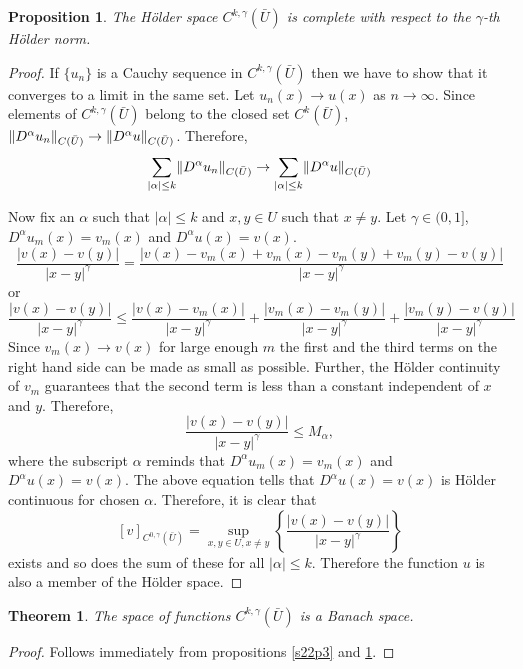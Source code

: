 \documentclass{article}
\DeclarePairedDelimiter\norm{\lVert}{\rVert}
\theoremstyle{plain}
\newtheorem{thm}{Theorem}
\numberwithin{thm}{section}
\theoremstyle{plain}
\newtheorem{prop}{Proposition}
\numberwithin{prop}{section}
\theoremstyle{definition}
\numberwithin{defn}{section}
\theoremstyle{remark}
\numberwithin{equation}{section}
\begin{document}
\begin{prop}\label{s22p4}
The H\"{o}lder space $C^{k, \gamma}(\bar{U})$ is complete with respect to the $\gamma$-th H\"{o}lder norm.
\end{prop}
\begin{proof}
If $\{u_n\}$ is a Cauchy sequence in $C^{k, \gamma}(\bar{U})$ then we have to show that it converges to a 
limit in the same set. Let $u_n(x) \rightarrow u(x)$ as $n \rightarrow \infty$. Since elements of
$C^{k, \gamma}(\bar{U})$ belong to the closed set $C^k(\bar{U})$, 
$\norm{D^\alpha u_n}_{C(\bar{U})} \rightarrow \norm{D^\alpha u}_{C(\bar{U})}$. Therefore,
\begin{equation}
\sum_{|\alpha| \le k}\norm{D^\alpha u_n}_{C(\bar{U})} \rightarrow 
\sum_{|\alpha| \le k}\norm{D^\alpha u}_{C(\bar{U})}
\end{equation}

Now fix an $\alpha$ such that $|\alpha| \le k$ and $x, y \in U$ such that $x \ne y$. Let $\gamma \in (0, 1]$,
 $D^\alpha u_m(x) = v_m(x)$ and $D^\alpha u(x) = v(x)$.
\[
\frac{|v(x) - v(y)|}{|x - y|^\gamma} = 
\frac{|v(x)- v_m(x) + v_m(x) - v_m(y) + v_m(y) - v(y)|}{|x - y|^\gamma}
\]
or
\[
\frac{|v(x) - v(y)|}{|x - y|^\gamma} \le
\frac{|v(x)- v_m(x)|}{|x - y|^\gamma} + \frac{|v_m(x)- v_m(y)|}{|x - y|^\gamma} + 
\frac{|v_m(y)- v(y)|}{|x - y|^\gamma}
\]
Since $v_m(x) \rightarrow v(x)$ for large enough $m$ the first and the third terms on the right hand side can be
made as small as possible. Further, the H\"{o}lder continuity of $v_m$ guarantees that the second term is less
than a constant independent of $x$ and $y$. Therefore,
\[
\frac{|v(x) - v(y)|}{|x - y|^\gamma} \le M_\alpha,
\]
where the subscript $\alpha$ reminds that $D^\alpha u_m(x) = v_m(x)$ and $D^\alpha u(x) = v(x)$. The above equation
tells that $D^\alpha u(x) = v(x)$ is H\"{o}lder continuous for chosen $\alpha$. Therefore, it is clear that
\[
[v]_{C^{0, \gamma}(\bar{U})} = 
\sup_{x, y \in U, x \ne y}\left\{\frac{|v(x) - v(y)|}{|x - y|^\gamma}\right\}
\]
exists and so does the sum of these for all $|\alpha| \le k$. Therefore the function $u$ is also a member of the
H\"{o}lder space.
\end{proof}

\begin{thm}\label{s22t1}
The space of functions $C^{k, \gamma}(\bar{U})$ is a Banach space.
\end{thm}
\begin{proof}
Follows immediately from propositions \ref{s22p3} and \ref{s22p4}.
\end{proof}
\end{document}
